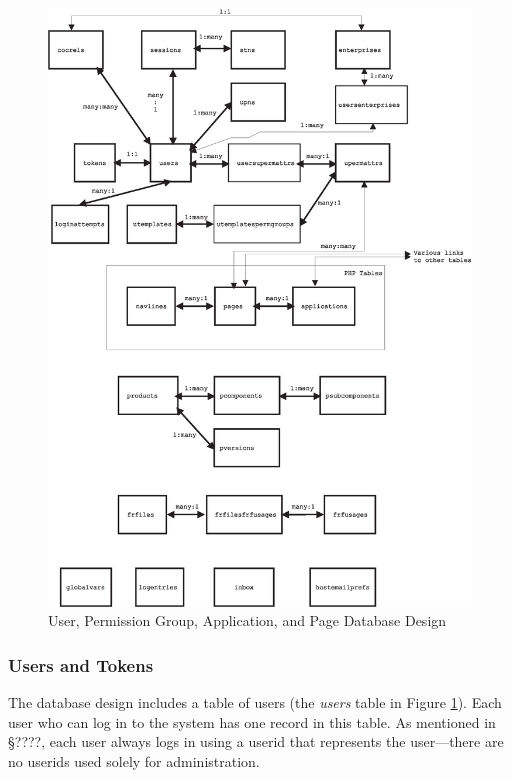 \begin{figure}
\centering
\includegraphics[width=4.6in]{c_tbg0/dbdesign01.eps}
\caption{User, Permission Group, Application, and Page Database Design}
\label{fig:ctbg0:sddd0:scfn0:spga0:00}
\end{figure}


\subsubsection{Users and Tokens}
\label{ctbg0:sddd0:scfn0:sutk0}

The database design includes a table of users (the \emph{users} table
in Figure \ref{fig:ctbg0:sddd0:scfn0:spga0:00}).  Each user who can log
in to the system has one record in this table.  As mentioned
in \S{}????, each user always logs in using a userid that 
represents the user---there
are no userids used solely for administration.

